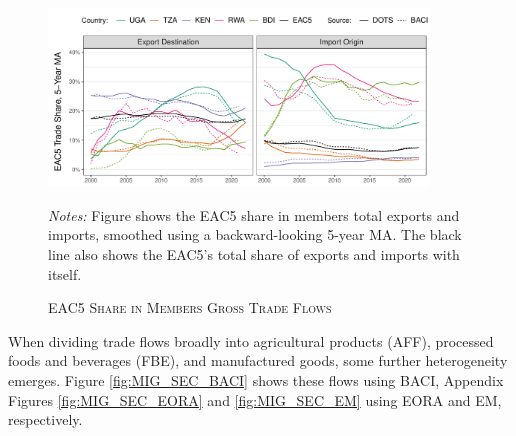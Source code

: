 \documentclass[a4paper]{article}
\begin{document}
\begin{figure}[h!] 
\centering
\caption{\label{fig:GTEACshares}\textsc{EAC5 Share in Members Gross Trade Flows}}
\includegraphics[width=0.9\textwidth, trim= {0 0 0 0}, clip]{"Figures/GT_EAC5_shares_ts.pdf"} \\ 
\raggedright
\scriptsize 
\emph{Notes:} Figure shows the EAC5 share in members total exports and imports, smoothed using a backward-looking 5-year MA. The black line also shows the EAC5's total share of exports and imports with itself.
\end{figure}
\FloatBarrier

When dividing trade flows broadly into agricultural products (AFF), processed foods and beverages (FBE), and manufactured goods, some further heterogeneity emerges. Figure \ref{fig:MIG_SEC_BACI} shows these flows using BACI, Appendix Figures \ref{fig:MIG_SEC_EORA} and \ref{fig:MIG_SEC_EM} using EORA and EM, respectively. \newline 
\end{document}

